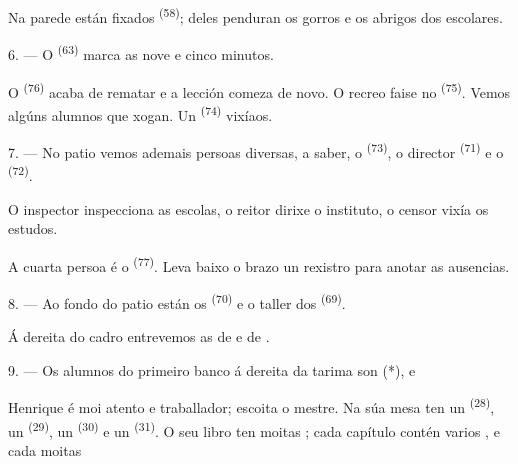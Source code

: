 Na parede están fixados  \textsuperscript{(58)}; deles penduran
os gorros e os abrigos dos escolares.

\VUsaut{5.2mm}
\VUsaut{3.6mm}

6. --- O  \textsuperscript{(63)} marca as nove e cinco minutos.

O  \textsuperscript{(76)} acaba de rematar e a lección comeza de
novo. O recreo faise no  \textsuperscript{(75)}. Vemos algúns alumnos
que xogan. Un  \textsuperscript{(74)} vixíaos.

7. --- No patio vemos ademais persoas diversas, a saber, o 
\textsuperscript{(73)}, o director  \textsuperscript{(71)} e o
 \textsuperscript{(72)}.

O inspector inspecciona as escolas, o reitor dirixe o instituto, o censor vixía os
estudos.

A cuarta persoa é o  \textsuperscript{(77)}. Leva baixo o brazo un
rexistro para anotar as ausencias.

8. --- Ao fondo do patio están os 
\textsuperscript{(70)} e o taller dos 
\textsuperscript{(69)}.

Á dereita do cadro entrevemos as  de  e de
.


\VUsaut{2.4mm}

\VUsaut{3.0mm}

9. --- Os alumnos do primeiro banco á dereita da tarima son  (*),
 e 

Henrique é moi atento e traballador; escoita o mestre. Na súa mesa ten un
 \textsuperscript{(28)}, un  \textsuperscript{(29)}, un
 \textsuperscript{(30)} e un 
\textsuperscript{(31)}. O seu libro ten moitas ; cada capítulo contén
varios , e cada  moitas 

